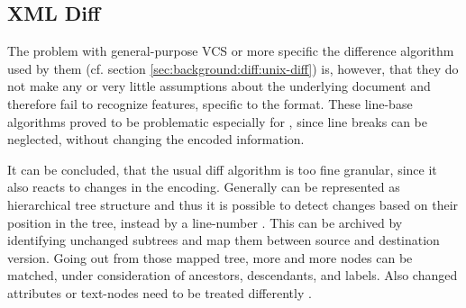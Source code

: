 	\subsection{XML Diff}
	\label{sec:background:diff:xml-diff}
	The problem with general-purpose VCS or more specific the difference algorithm used by them (cf. section \ref{sec:background:diff:unix-diff}) is, however, that they do not make any or very little assumptions about the underlying document and therefore fail to recognize features, specific to the format. These line-base algorithms proved to be problematic especially for \xml, since line breaks can be neglected, without changing the encoded information. \citep{Ronnau2005}
	
	It can be concluded, that the usual diff algorithm is too fine granular, since it also reacts to changes in the encoding. Generally \xml can be represented as hierarchical tree structure and thus it is possible to detect changes based on their position in the tree, instead by a line-number \citep{Wang2003,Chawathe1996,Cobena2002}.
	This can be archived by identifying unchanged subtrees and map them between source and destination version. Going out from those mapped tree, more and more nodes can be matched, under consideration of ancestors, descendants, and labels. Also changed attributes or text-nodes need to be treated differently \citep{Cobena2002}.
	
	
